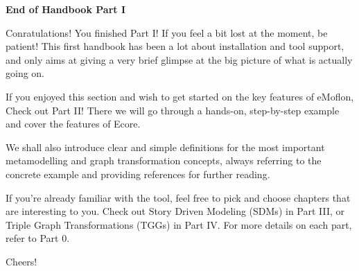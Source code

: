\newpage
\noHeader

\vspace*{2cm}

{\bf \large End of Handbook Part I }
\vspace{0.5cm}

Conratulations! You finished Part I! If you feel a bit lost at the moment, be patient! This first handbook has been a lot about installation and tool support, and only aims at giving a very brief glimpse at the big picture of what is actually going on.  

If you enjoyed this section and wish to get started on the key features of eMoflon, Check out Part II! There we will go through a hands-on, step-by-step example and cover the features of Ecore.

We shall also introduce clear and simple definitions for the most important metamodelling and graph transformation concepts, always referring to the concrete example and providing references for further reading.

If you're already familiar with the tool, feel free to pick and choose chapters that are interesting to you. Check out Story Driven Modeling (SDMs) in Part III, or Triple Graph Transformations (TGGs) in Part IV. For more details on each part, refer to Part 0.

Cheers!